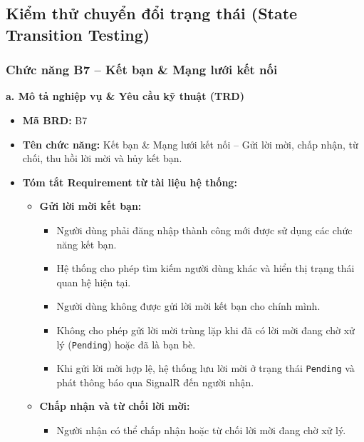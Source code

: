 \documentclass[11pt,a4paper]{article}
\begin{document}
\subsection{Kiểm thử chuyển đổi trạng thái (State Transition Testing)}

\subsubsection{Chức năng B7 -- Kết bạn \& Mạng lưới kết nối}

\noindent\textbf{a. Mô tả nghiệp vụ \& Yêu cầu kỹ thuật (TRD)}
\begin{itemize}[leftmargin=1.2cm, noitemsep]
    \item[\textbf{--}] \textbf{Mã BRD:} B7
    \item[\textbf{--}] \textbf{Tên chức năng:} Kết bạn \& Mạng lưới kết nối -- Gửi lời mời, chấp nhận, từ chối, thu hồi lời mời và hủy kết bạn.
    \item[\textbf{--}] \textbf{Tóm tắt Requirement từ tài liệu hệ thống:}
    \begin{itemize}[leftmargin=0.8cm, label=$\ast$, noitemsep]
        \item \textbf{Gửi lời mời kết bạn:}
        \begin{itemize}[leftmargin=0.6cm, label=$\circ$, noitemsep]
            \item Người dùng phải đăng nhập thành công mới được sử dụng các chức năng kết bạn.
            \item Hệ thống cho phép tìm kiếm người dùng khác và hiển thị trạng thái quan hệ hiện tại.
            \item Người dùng không được gửi lời mời kết bạn cho chính mình.
            \item Không cho phép gửi lời mời trùng lặp khi đã có lời mời đang chờ xử lý (\texttt{Pending}) hoặc đã là bạn bè.
            \item Khi gửi lời mời hợp lệ, hệ thống lưu lời mời ở trạng thái \texttt{Pending} và phát thông báo qua SignalR đến người nhận.
        \end{itemize}
        \item \textbf{Chấp nhận và từ chối lời mời:}
        \begin{itemize}[leftmargin=0.6cm, label=$\circ$, noitemsep]
            \item Người nhận có thể chấp nhận hoặc từ chối lời mời đang chờ xử lý.

\end{itemize}
\end{itemize}
\end{itemize}
\end{document}
